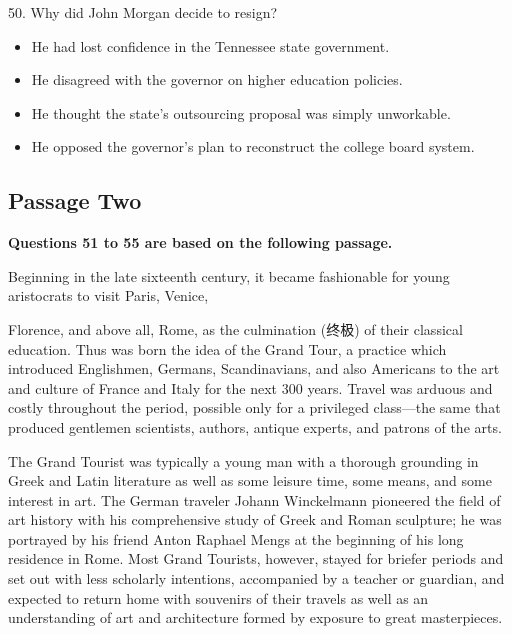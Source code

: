 \documentclass[UTF8,11pt]{ctexart}
\begin{document}
50. Why did John Morgan decide to resign?


\begin{itemize}[leftmargin=2em,itemsep=.2em,topsep=.4em]\item[A.] He had lost confidence in the Tennessee state government.
\item[B.] He disagreed with the governor on higher education policies.
\item[C.] He thought the state's outsourcing proposal was simply unworkable.
\item[D.] He opposed the governor's plan to reconstruct the college board system.
\end{itemize}

\subsection*{\textbf{Passage Two}}


\textbf{Questions 51 to 55 are based on the following passage.}


Beginning in the late sixteenth century, it became fashionable for young aristocrats to visit Paris, Venice,


Florence, and above all, Rome, as the culmination (终极) of their classical education. Thus was born the idea of the Grand Tour, a practice which introduced Englishmen, Germans, Scandinavians, and also Americans to the art and culture of France and Italy for the next 300 years. Travel was arduous and costly throughout the period, possible only for a privileged class—the same that produced gentlemen scientists, authors, antique experts, and patrons of the arts.


The Grand Tourist was typically a young man with a thorough grounding in Greek and Latin literature as well as some leisure time, some means, and some interest in art. The German traveler Johann Winckelmann pioneered the field of art history with his comprehensive study of Greek and Roman sculpture; he was portrayed by his friend Anton Raphael Mengs at the beginning of his long residence in Rome. Most Grand Tourists, however, stayed for briefer periods and set out with less scholarly intentions, accompanied by a teacher or guardian, and expected to return home with souvenirs of their travels as well as an understanding of art and architecture formed by exposure to great masterpieces.
\end{document}
